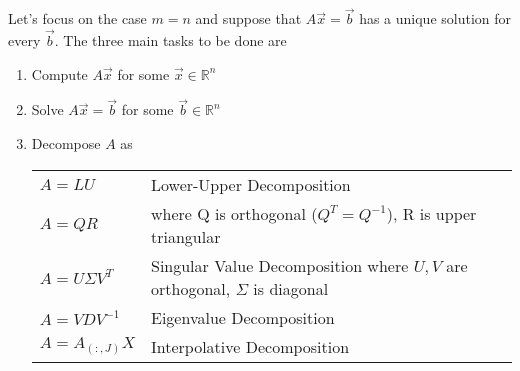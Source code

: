\begin{center}
	
\end{center}

Let's focus on the case $m=n$ and suppose that $A\Vec{x} = \Vec{b}$ has a unique solution for every $\Vec{b}$. The three main tasks to be done are 

\begin{enumerate}[{label=\arabic*)}]
    \item Compute $A\Vec{x}$ for some $\Vec{x}\in\mathbb{R}^n$
    \item Solve $A\Vec{x}=\Vec{b}$ for some $\Vec{b}\in\mathbb{R}^n$
    \item Decompose $A$ as 
    
    \begin{tabular}{ll}
         $A=LU$ & Lower-Upper Decomposition  \\
         $A=QR$ & where Q is orthogonal ($Q^T=Q^{-1}$), R is upper triangular\\
         $A=U\Sigma V^T$ & Singular Value Decomposition where $U, V$ are orthogonal, $\Sigma$ is diagonal\\
         $A=VDV^{-1}$ & Eigenvalue Decomposition\\
         $A=A_{(:, J)}X$ & Interpolative Decomposition
    \end{tabular}
\end{enumerate}
